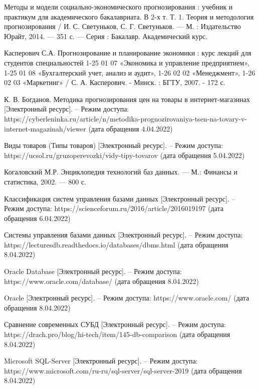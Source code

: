\documentclass[a4paper,14pt]{extreport}
\begin{document}
\begin{thebibliography}{3}
	 Методы и модели социально-экономического прогнозирования : учебник и практикум для академического бакалавриата. В 2-х т. Т. 1. Теория и методология прогнозирования / И. С. Светуньков, С. Г. Светуньков. — М. : Издательство Юрайт, 2014. — 351 с. — Серия : Бакалавр. Академический курс.
	
	 Касперович С.А. Прогнозирование и планирование экономики : курс лекций для студентов специальностей 1-25 01 07 «Экономика и управление предприятием», 1-25 01 08 «Бухгалтерский учет, анализ и аудит», 1-26 02 02 «Менеджмент», 1-26 02 03 «Маркетинг» / С. А. Касперович. - Минск. : БГТУ, 2007. - 172 с. 
	
	 К. В. Богданов. Методика прогнозирования цен на товары в интернет-магазинах [Электронный ресурс]. -- Режим доступа: https://cyberleninka.ru/article/n/metodika-prognozirovaniya-tsen-na-tovary-v-internet-magazinah/viewer (дата обращения 4.04.2022)
	
	 Виды товаров (Типы товаров) [Электронный ресурс]. -- Режим доступа:  https://ucsol.ru/gruzoperevozki/vidy-tipy-tovarov (дата обращения 5.04.2022)
	
	 Когаловский М.Р. Энциклопедия технологий баз данных. — М.: Финансы и статистика, 2002. — 800 с.
	
	 Классификация систем управления базами данных [Электронный ресурс]. -- Режим доступа: https://scienceforum.ru/2016/article/2016019197 (дата обращения 6.04.2022)
	
	 Системы управления базами данных [Электронный ресурс]. -- Режим доступа: https://lecturesdb.readthedocs.io/databases/dbms.html (дата обращения 8.04.2022)
	
	 Oracle Database [Электронный ресурс]. -- Режим доступа: https://www.oracle.com/database/ (дата обращения 8.04.2022)
	
	 Oracle [Электронный ресурс]. -- Режим доступа: https://www.oracle.com/ (дата обращения 8.04.2022)
	
	 Сравнение современных СУБД [Электронный ресурс]. -- Режим доступа:  https://drach.pro/blog/hi-tech/item/145-db-comparison (дата обращения 8.04.2022)
	
	 Microsoft SQL-Server  [Электронный ресурс]. -- Режим доступа:  https://www.microsoft.com/ru-ru/sql-server/sql-server-2019 (дата обращения 8.04.2022)
	

\end{thebibliography}
\end{document}
